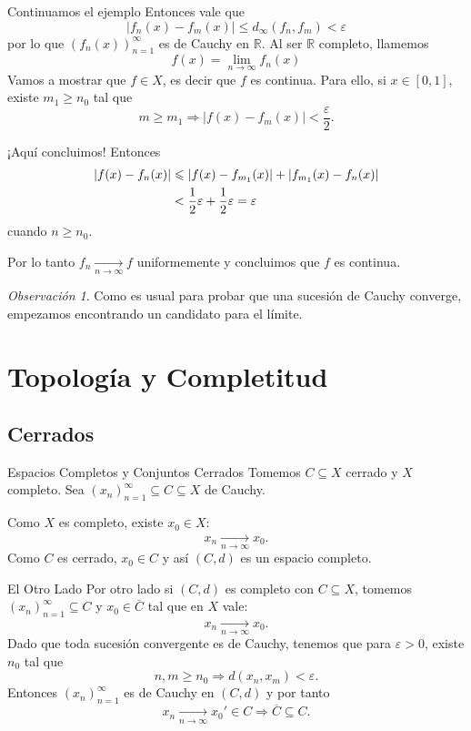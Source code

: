 \documentclass[utf8]{beamer}
\theoremstyle{plain}
\theoremstyle{definition}
\theoremstyle{remark}
\newtheorem{Rmk}[Th]{Observación}      %
\numberwithin{equation}{section}
\newcommand{\eps}{\varepsilon}          %
\newcommand{\bR}{\mathbb{R}}    %
\renewcommand{\geq}{\geqslant}          %
\renewcommand{\leq}{\leqslant}          %
\newcommand{\To}{\Rightarrow}
\newcommand{\ov}{\overline}
\newcommand{\half}{{\mathchoice{\nhalf}{\thalf}{\shalf}{\shalf}}} %
\newcommand{\nhalf}{\frac{1}{2}}
\newcommand{\shalf}{{\scriptstyle\frac{1}{2}}} %
\newcommand{\thalf}{{\tfrac{1}{2}}} %
\newcommand{\sucn}{_{n=1}^\infty} %
\begin{document}
\begin{frame}{Continuamos el ejemplo}
  Entonces vale que 
  $$|f_n(x)-f_m(x)|\leq d_\infty(f_n,f_m)<\eps$$
  por lo que $(f_n(x))_{n=1}^\infty$ es de Cauchy en $\bR$. Al ser $\bR$ completo, llamemos
  $$f(x)=\lim_{n\to\infty}f_n(x)$$
  Vamos a mostrar que $f\in X$, es decir que $f$ es continua. Para ello, si $x\in[0,1]$, existe $m_1\geq n_0$ tal que 
  $$m\geq m_1\To |f(x)-f_m(x)|<\frac{\eps}{2}.$$
\end{frame}

\begin{frame}{¡Aquí concluimos!}
  Entonces 
  \begin{align*}
    |f(x)-f_n(x)|&\leq |f(x)-f_{m_1}(x)|+|f_{m_1}(x)-f_n(x)|\\
    &<\half\eps+\half\eps=\eps
  \end{align*}
  cuando $n\geq n_0$.\par 
  Por lo tanto $f_n\xrightarrow[n\to\infty]{} f$ uniformemente y concluimos que $f$ es continua.
  \begin{Rmk}
    Como es usual para probar que una sucesión de Cauchy converge, empezamos encontrando un candidato para el límite.
  \end{Rmk}
\end{frame}

\section{Topología y Completitud}

\subsection{Cerrados}

\begin{frame}{Espacios Completos y Conjuntos Cerrados}
  Tomemos $C\subseteq X$ cerrado y $X$ completo. Sea $(x_n)\sucn\subseteq C\subseteq X$ de Cauchy.\par 
  Como $X$ es completo, existe $x_0\in X$:
  $$x_n\xrightarrow[n\to\infty]{}x_0.$$
  Como $C$ es cerrado, $x_0\in C$ y así $(C,d)$ es un espacio completo.\par 
  
\end{frame}

\begin{frame}{El Otro Lado}
  Por otro lado si $(C,d)$ es completo con $C\subseteq X$, tomemos $(x_n)\sucn\subseteq C$ y $x_0\in\ov C$ tal que en $X$ vale:
  $$x_n\xrightarrow[n\to\infty]{}x_0.$$
  Dado que toda sucesión convergente es de Cauchy, tenemos que para $\eps>0$, existe $n_0$ tal que 
  $$n,m\geq n_0\To d(x_n,x_m)<\eps.$$
  Entonces $(x_n)\sucn$ es de Cauchy en $(C,d)$ y por tanto 
  $$x_n\xrightarrow[n\to\infty]{}x_0'\in C\To \ov C\subseteq C.$$
\end{frame}
\end{document}
